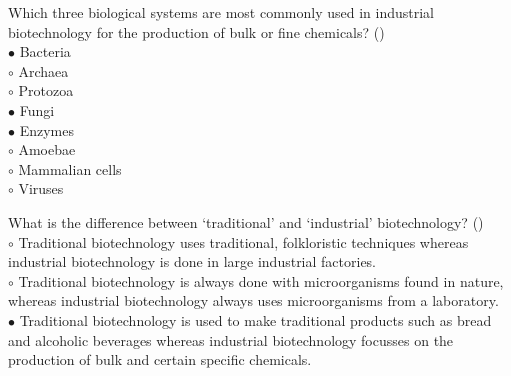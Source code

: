 \documentclass[]{beamer}
\begin{document}
\begin{CJK}{UTF8}{gbsn}
\begin{frame}[shrink] {} 
\addtocounter{answers}{1}
\color{blue}
  Which three biological systems are most commonly used in industrial biotechnology for the production of bulk or fine chemicals? 
 ({})\\
\color{black}
\setlength{\parindent}{-0.4cm}
{\color{red}$\bullet$} Bacteria   \\
{\color{red}$\circ$} Archaea   \\
{\color{red}$\circ$} Protozoa  \\
{\color{red}$\bullet$} Fungi  \\
{\color{red}$\bullet$} Enzymes  \\
{\color{red}$\circ$} Amoebae  \\
{\color{red}$\circ$} Mammalian cells  \\
{\color{red}$\circ$} Viruses  \\
\end{frame}


\begin{frame}[shrink] {} 
\addtocounter{answers}{1}
\color{blue}
  What is the difference between ‘traditional’ and ‘industrial’ biotechnology?
 ({})\\
\color{black}
\setlength{\parindent}{-0.4cm}
{\color{red}$\circ$} Traditional biotechnology uses traditional, folkloristic techniques whereas industrial biotechnology is done in large industrial factories.  \\
{\color{red}$\circ$} Traditional biotechnology is always done with microorganisms found in nature, whereas industrial biotechnology always uses microorganisms from a laboratory.  \\
{\color{red}$\bullet$} Traditional biotechnology  is used to make traditional products such as bread and alcoholic beverages whereas industrial biotechnology focusses on the production of bulk and certain specific chemicals.  \\
\end{frame}



\end{CJK}
\end{document}
